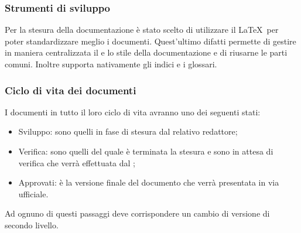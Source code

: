 \documentclass[../NormeDiProgetto.tex]{subfiles}
\begin{document}
\subsubsection{Strumenti di sviluppo}
Per la stesura della documentazione è stato scelto di utilizzare il  \LaTeX\ per poter standardizzare meglio i documenti. Quest'ultimo difatti permette di gestire in maniera centralizzata il  e lo stile della documentazione e di riusarne le parti comuni. Inoltre supporta nativamente gli indici e i glossari.

\subsubsection{Ciclo di vita dei documenti}
I documenti in tutto il loro ciclo di vita avranno uno dei seguenti stati:
\begin{itemize}
\item Sviluppo: sono quelli in fase di stesura dal relativo redattore;
\item Verifica: sono quelli del quale è terminata la stesura e sono in attesa di verifica che verrà effettuata dal \gl{\responsabilediprogetto};
\item Approvati: è la versione finale del documento che verrà presentata in via ufficiale.
\end{itemize}
Ad ognuno di questi passaggi deve corrispondere un cambio di versione di secondo livello.
\end{document}
